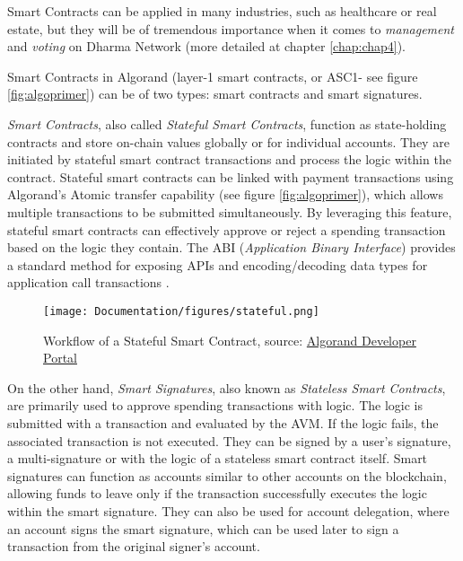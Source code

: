 Smart Contracts can be applied in many industries, such as healthcare or real estate, but they will be of tremendous importance when it comes to \textit{management} and \textit{voting} on Dharma Network (more detailed at chapter \ref{chap:chap4}).\newline

Smart Contracts in Algorand (layer-1 smart contracts, or ASC1- see figure \ref{fig:algoprimer}) can be of two types: smart contracts and smart signatures.\newline

\textit{Smart Contracts}, also called \textit{Stateful Smart Contracts}, function as state-holding contracts and store on-chain values globally or for individual accounts. They are initiated by stateful smart contract transactions and process the logic within the contract.\newline 
Stateful smart contracts can be linked with payment transactions using Algorand's Atomic transfer capability (see figure \ref{fig:algoprimer}), which allows multiple transactions to be submitted simultaneously. By leveraging this feature, stateful smart contracts can effectively approve or reject a spending transaction based on the logic they contain. The ABI (\textit{Application Binary Interface}) provides a standard method for exposing APIs and encoding/decoding data types for application call transactions \cite{scalgo, scalgo2}.\newline

\begin{figure}[htbp]
	\centering
	\texttt{[image: Documentation/figures/stateful.png]}  %
	\caption{Workflow of a Stateful Smart Contract, source: \href{https://developer.algorand.org/articles/linking-algorand-stateful-and-stateless-smart-contracts/}{Algorand Developer Portal}}
	\label{fig:stateful}
\end{figure}

On the other hand, \textit{Smart Signatures}, also known as \textit{Stateless Smart Contracts}, are primarily used to approve spending transactions with logic. The logic is submitted with a transaction and evaluated by the AVM. If the logic fails, the associated transaction is not executed. They can be signed by a user's signature, a multi-signature or with the logic of a stateless smart contract itself. \newline
Smart signatures can function as accounts similar to other accounts on the blockchain, allowing funds to leave only if the transaction successfully executes the logic within the smart signature. They can also be used for account delegation, where an account signs the smart signature, which can be used later to sign a transaction from the original signer's account\cite{scalgo, scalgo2}.

